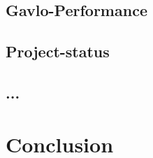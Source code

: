 \documentclass[master,english,smartquotes,apa]{hgbthesis}
\begin{document}
		\section{Gavlo-Performance}
		\section{Project-status}
		\section{ ... }
	\chapter{Conclusion}
	\label{cha:Conclusion}



% 
% 
% 
% 
% 

\appendix                                                             %


\backmatter                           %

\MakeBibliography %


% 

\end{document}
